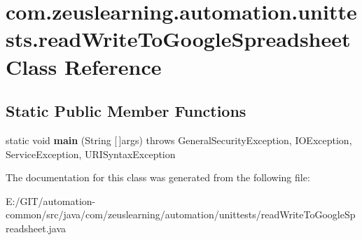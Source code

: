\hypertarget{classcom_1_1zeuslearning_1_1automation_1_1unittests_1_1readWriteToGoogleSpreadsheet}{}\section{com.\+zeuslearning.\+automation.\+unittests.\+read\+Write\+To\+Google\+Spreadsheet Class Reference}
\label{classcom_1_1zeuslearning_1_1automation_1_1unittests_1_1readWriteToGoogleSpreadsheet}
\subsection*{Static Public Member Functions}
\begin{DoxyCompactItemize}
\item 
\hypertarget{classcom_1_1zeuslearning_1_1automation_1_1unittests_1_1readWriteToGoogleSpreadsheet_a47a00b021f967470ab3ba2c4d39dc4ed}{}\label{classcom_1_1zeuslearning_1_1automation_1_1unittests_1_1readWriteToGoogleSpreadsheet_a47a00b021f967470ab3ba2c4d39dc4ed} 
static void {\bfseries main} (String \mbox{[}$\,$\mbox{]}args)  throws General\+Security\+Exception, I\+O\+Exception, Service\+Exception, U\+R\+I\+Syntax\+Exception 
\end{DoxyCompactItemize}


The documentation for this class was generated from the following file\+:\begin{DoxyCompactItemize}
\item 
E\+:/\+G\+I\+T/automation-\/common/src/java/com/zeuslearning/automation/unittests/read\+Write\+To\+Google\+Spreadsheet.\+java\end{DoxyCompactItemize}
